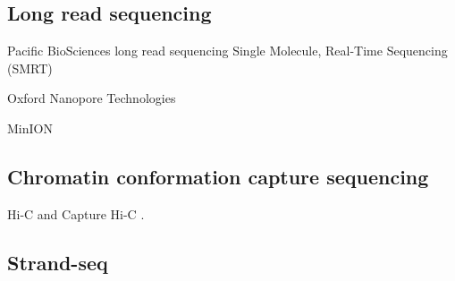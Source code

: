 \subsection{Long read sequencing}
\label{sec:long_read_seq}



Pacific BioSciences\texorpdfstring{\textsuperscript{\textregistered}}{(R)} long read sequencing
Single Molecule, Real-Time Sequencing (SMRT\textsuperscript{\textregistered})


Oxford Nanopore Technologies\texorpdfstring{\textsuperscript{\textregistered}}{{R}}

MinION\textregistered


\subsection{Chromatin conformation capture sequencing}
\label{sec:ccc}

Hi-C \citep{Lieberman-Aiden2009} and Capture Hi-C \citep{Dryden2014,Schoenfelder2015,Jager2015,Mifsud2015}.

\subsection{Strand-seq}
\label{sec:strandseq}


